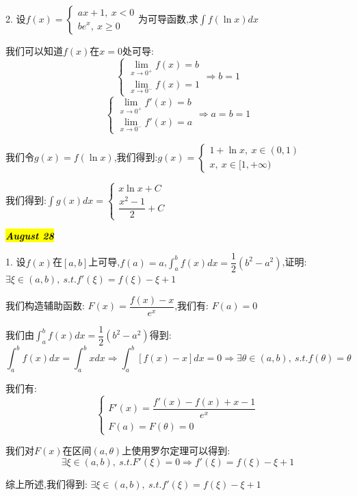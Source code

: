 2. 设$f(x)=\left\lbrace
\begin{array}{l}
	ax+1,\ x<0\\
	be^x,\ x\geq 0
\end{array}
\right. $为可导函数,求$\int f(\ln x)dx$
\begin{solution}

	我们可以知道$f(x)$在$x=0$处可导:
	$$\left\lbrace
	\begin{array}{l}
		\lim\limits_{x\rightarrow 0^{+}}f(x)=b\\
		\lim\limits_{x\rightarrow 0^{-}}f(x)=1
	\end{array}
	\right. \Rightarrow b=1$$
	$$\left\lbrace
	\begin{array}{l}
		\lim\limits_{x\rightarrow 0^{+}}f'(x)=b\\
		\lim\limits_{x\rightarrow 0^{-}}f'(x)=a
	\end{array}
	\right.\Rightarrow a=b=1$$
	
	我们令$g(x)=f(\ln x)$,我们得到:$g(x)=\left\lbrace
	\begin{array}{l}
		1+\ln x,\ x\in(0,1)\\
		x,\ x\in[1,+\infty)
	\end{array}
	\right. $
	
	我们得到:$\int g(x)dx=\left\lbrace
	\begin{array}{l}
		x\ln x+C\\
		\dfrac{x^2-1}{2}+C
	\end{array}
	\right. $
\end{solution}

\hl{\textbf{\textit{August 28}}}

1. 设$f(x)$在$[a,b]$上可导,$f(a)=a$,$\int_{a}^{b}f(x)dx=\dfrac{1}{2}(b^2-a^2)$,证明:$\exists\xi\in(a,b),\ s.t. f'(\xi)=f(\xi)-\xi+1$
\begin{solution}

	我们构造辅助函数:  $F(x)=\dfrac{f(x)-x}{e^x}$,我们有:  $F(a)=0$
	
	我们由$\int_{a}^{b}f(x)dx=\dfrac{1}{2}(b^2-a^2)$得到:  
	$$\int_{a}^{b}f(x)dx=\int_{a}^{b}xdx\Rightarrow \int_{a}^{b}\left[ f(x)-x\right] dx=0\Rightarrow \exists \theta\in(a,b),\ s.t. f(\theta)=\theta$$
	
	我们有:  
	$$\left\lbrace
	\begin{array}{l}
		F'(x)=\dfrac{f'(x)-f(x)+x-1}{e^x}\\
		F(a)=F(\theta)=0
	\end{array}
	\right. $$
	
	我们对$F(x)$在区间$(a,\theta)$上使用罗尔定理可以得到:  
	$$\exists\xi\in(a,b),\ s.t. F'(\xi)=0\Rightarrow f'(\xi)=f(\xi)-\xi+1$$
	
	综上所述,我们得到:  $\exists\xi\in(a,b),\ s.t. f'(\xi)=f(\xi)-\xi+1$
\end{solution}

